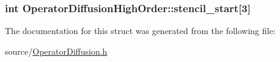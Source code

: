 \subsubsection[{stencil\+\_\+start}]{\setlength{\rightskip}{0pt plus 5cm}int Operator\+Diffusion\+High\+Order\+::stencil\+\_\+start\mbox{[}3\mbox{]}}\label{struct_operator_diffusion_high_order_a24900868ca9406abe8e5c1354c4491b9}


The documentation for this struct was generated from the following file\+:\begin{DoxyCompactItemize}
\item 
source/\hyperlink{_operator_diffusion_8h}{Operator\+Diffusion.\+h}\end{DoxyCompactItemize}
